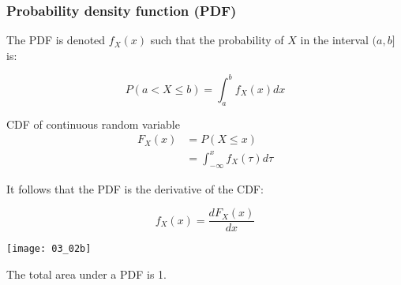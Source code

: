\documentclass[usenames,dvipsnames,smaller%
]{beamer}
\newcommand{\?}{\stackrel{?}{=}}
\newcommand{\fr}{\frac}
\begin{document}
\begin{frame}
  \frametitle{Probability density function (PDF)}\pause

  \begin{minipage}{.45\linewidth}
  The PDF is denoted $f_X(x)$ such that the probability of $X$ in the interval $(a,b]$ is: \pause

  \begin{equation}
    \label{eq:10}
    P(a< X \le b) = \int_a^b f_X(x)dx
  \end{equation}

  \pause
  
  \begin{alertblock}{CDF of continuous random variable}
    \pause
    \begin{align*}
      \label{eq:15}
      F_X(x) &=  P(X \le x)\\
             &= \int_{-\infty}^x f_X(\tau)d\tau
    \end{align*}
  \end{alertblock}

    \pause

    It follows that the PDF is the derivative of the CDF:

    \begin{equation}
      \label{eq:15}
      f_X(x) = \fr{dF_X(x)}{dx}
    \end{equation}
  \end{minipage}
  \begin{minipage}{.45\linewidth}
    \texttt{[image: 03\_02b]}
    
  \pause  
  The total area under a PDF is 1.
\end{minipage}

\end{frame}
\end{document}
